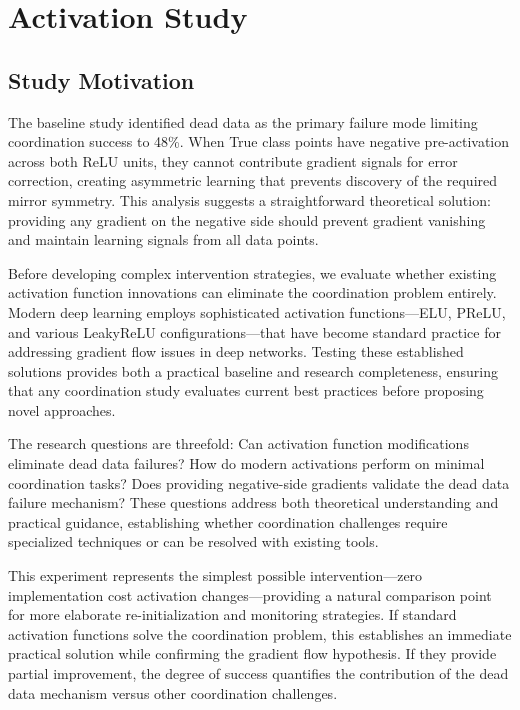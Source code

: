 \section{Activation Study}
\label{sec:relu1-activations}


\subsection*{Study Motivation}

The baseline study identified dead data as the primary failure mode limiting coordination success to 48\%. When True class points have negative pre-activation across both ReLU units, they cannot contribute gradient signals for error correction, creating asymmetric learning that prevents discovery of the required mirror symmetry. This analysis suggests a straightforward theoretical solution: providing any gradient on the negative side should prevent gradient vanishing and maintain learning signals from all data points.

Before developing complex intervention strategies, we evaluate whether existing activation function innovations can eliminate the coordination problem entirely. Modern deep learning employs sophisticated activation functions—ELU, PReLU, and various LeakyReLU configurations—that have become standard practice for addressing gradient flow issues in deep networks. Testing these established solutions provides both a practical baseline and research completeness, ensuring that any coordination study evaluates current best practices before proposing novel approaches.

The research questions are threefold: Can activation function modifications eliminate dead data failures? How do modern activations perform on minimal coordination tasks? Does providing negative-side gradients validate the dead data failure mechanism? These questions address both theoretical understanding and practical guidance, establishing whether coordination challenges require specialized techniques or can be resolved with existing tools.

This experiment represents the simplest possible intervention—zero implementation cost activation changes—providing a natural comparison point for more elaborate re-initialization and monitoring strategies. If standard activation functions solve the coordination problem, this establishes an immediate practical solution while confirming the gradient flow hypothesis. If they provide partial improvement, the degree of success quantifies the contribution of the dead data mechanism versus other coordination challenges.

